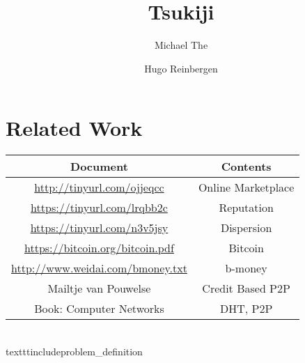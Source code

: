 \documentclass[]{article}
\title{Tsukiji}
\author{Michael The \and Hugo Reinbergen}
\begin{document}
\maketitle

\section*{Related Work}
\begin{tabular}{|c|c|}
 \hline
 Document & Contents  \\
 \hline
 \url{http://tinyurl.com/ojjeqcc} & Online Marketplace \\
 \url{https://tinyurl.com/lrqbb2c} & Reputation \\
 \url{https://tinyurl.com/n3v5jsy} & Dispersion \\
 \url{https://bitcoin.org/bitcoin.pdf} & Bitcoin \\
 \url{http://www.weidai.com/bmoney.txt} & b-money \\
 Mailtje van Pouwelse & Credit Based P2P \\
 Book: Computer Networks & DHT, P2P \\
 \hline
\end{tabular}




\tableofcontents



\\texttt{include}{problem_definition}



\end{document}
